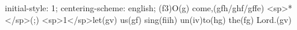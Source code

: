 initial-style: 1;
centering-scheme: english;
(f3)O(g) come,(gfh/ghf/gffe) <sp>*</sp>(;) <sp>1</sp>let(gv) us(gf) sing(fiih) un(iv)to(hg) the(fg) Lord.(gv)
